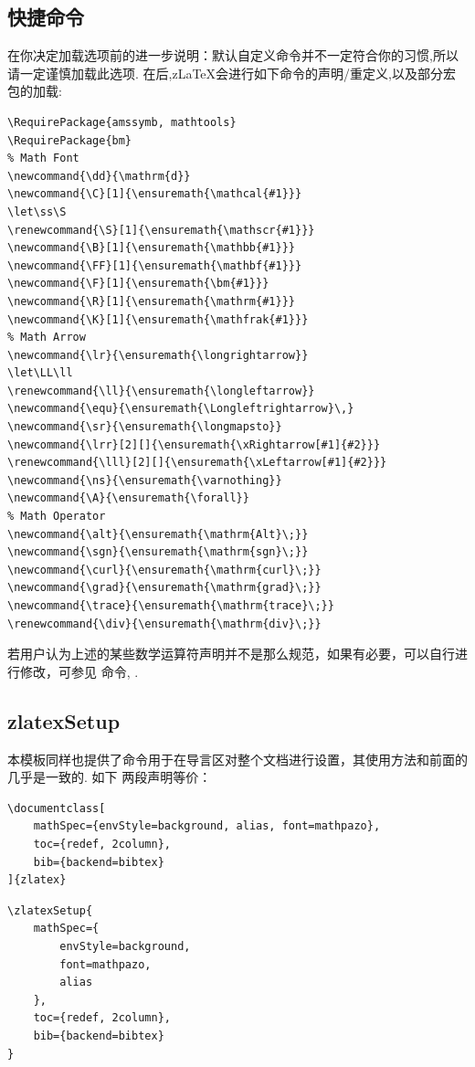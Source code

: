 \subsection{快捷命令}\label{快捷命令}
在你决定加载选项前的进一步说明：默认自定义命令并不一定符合你的习惯,所以请一定谨慎加载此选项.
在后,z\LaTeX{}会进行如下命令的声明/重定义,以及部分宏包的加载:
\begin{verbatim}
\RequirePackage{amssymb, mathtools}
\RequirePackage{bm}          
% Math Font 
\newcommand{\dd}{\mathrm{d}}
\newcommand{\C}[1]{\ensuremath{\mathcal{#1}}}
\let\ss\S
\renewcommand{\S}[1]{\ensuremath{\mathscr{#1}}}
\newcommand{\B}[1]{\ensuremath{\mathbb{#1}}}
\newcommand{\FF}[1]{\ensuremath{\mathbf{#1}}}
\newcommand{\F}[1]{\ensuremath{\bm{#1}}}
\newcommand{\R}[1]{\ensuremath{\mathrm{#1}}}
\newcommand{\K}[1]{\ensuremath{\mathfrak{#1}}}
% Math Arrow 
\newcommand{\lr}{\ensuremath{\longrightarrow}}
\let\LL\ll
\renewcommand{\ll}{\ensuremath{\longleftarrow}}
\newcommand{\equ}{\ensuremath{\Longleftrightarrow}\,}
\newcommand{\sr}{\ensuremath{\longmapsto}}
\newcommand{\lrr}[2][]{\ensuremath{\xRightarrow[#1]{#2}}}
\renewcommand{\lll}[2][]{\ensuremath{\xLeftarrow[#1]{#2}}}
\newcommand{\ns}{\ensuremath{\varnothing}}
\newcommand{\A}{\ensuremath{\forall}}
% Math Operator
\newcommand{\alt}{\ensuremath{\mathrm{Alt}\;}}
\newcommand{\sgn}{\ensuremath{\mathrm{sgn}\;}}
\newcommand{\curl}{\ensuremath{\mathrm{curl}\;}}
\newcommand{\grad}{\ensuremath{\mathrm{grad}\;}}
\newcommand{\trace}{\ensuremath{\mathrm{trace}\;}}
\renewcommand{\div}{\ensuremath{\mathrm{div}\;}}
\end{verbatim}

若用户认为上述的某些数学运算符声明并不是那么规范，如果有必要，可以自行进行修改，可参见
命令\cmd{\DeclareMathOperator}, \cmd{\DeclareMathAlphabet}.

\subsection{zlatexSetup}
本模板同样也提供了命令\cmd{\zlatexSetup}用于在导言区对整个文档进行设置，其使用方法和前面的几乎是一致的. 如下
两段声明等价：
\begin{verbatim}
\documentclass[
    mathSpec={envStyle=background, alias, font=mathpazo},
    toc={redef, 2column},
    bib={backend=bibtex}
]{zlatex}
\end{verbatim}

\begin{verbatim}
\zlatexSetup{
    mathSpec={
        envStyle=background,
        font=mathpazo, 
        alias
    },
    toc={redef, 2column},
    bib={backend=bibtex}
}
\end{verbatim}

